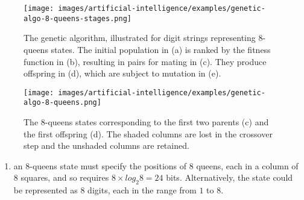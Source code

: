 \begin{figure}[H]
    \centering
    \texttt{[image: images/artificial-intelligence/examples/genetic-algo-8-queens-stages.png]}
    \caption{
        The genetic algorithm, illustrated for digit strings representing 8-queens states.
        The initial population in (a) is ranked by the fitness function in (b), resulting in pairs for mating in (c). They produce offspring in (d), which are subject to mutation in (e).
        \cite{ai/book/Artificial-Intelligence-A-Modern-Approach/Russell-Norvig}
    }
\end{figure}


\begin{figure}[H]
    \centering
    \texttt{[image: images/artificial-intelligence/examples/genetic-algo-8-queens.png]}
    \caption{
        The 8-queens states corresponding to the first two parents (c) and the first offspring (d).
        The shaded columns are lost in the crossover step and the unshaded columns are retained.
        \cite{ai/book/Artificial-Intelligence-A-Modern-Approach/Russell-Norvig}
    }
    \label{fig:enter-label}
\end{figure}


\begin{enumerate}
    \item an $8$-queens state must specify the positions of $8$ queens, each in a column of $8$ squares, and so requires $8 \times log_2 8 = 24$ bits.
    Alternatively, the state could be represented as 8 digits, each in the range from $1$ to $8$.
    \hfill \cite{ai/book/Artificial-Intelligence-A-Modern-Approach/Russell-Norvig}
\end{enumerate}

















